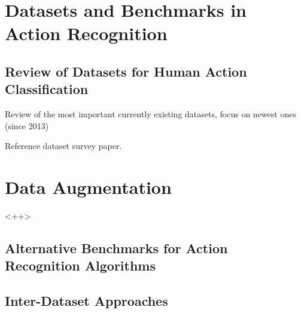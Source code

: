 \section{Datasets and Benchmarks in Action Recognition}

\subsection{Review of Datasets for Human Action Classification}
Review of the most important currently existing datasets, focus on newest ones (since 2013)

Reference dataset survey paper.

\section{Data Augmentation}<++>

\subsection{Alternative Benchmarks for Action Recognition Algorithms}

\subsection{Inter-Dataset Approaches}

